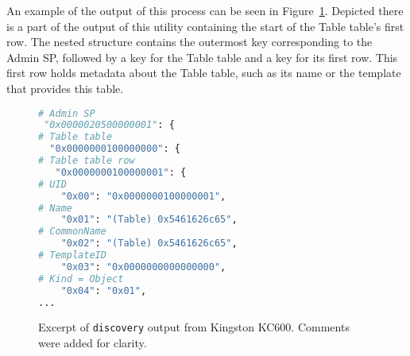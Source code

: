 An example of the output of this process can be seen in Figure~\ref{fig:discovery_example}. Depicted there is a part of the output of this utility containing the start of the Table table's first row. The nested structure contains the outermost key corresponding to the Admin SP, followed by a key for the Table table and a key for its first row. 
This first row holds metadata about the Table table, such as its name or the template that provides this table.


\begin{figure}
    \centering
\begin{lstlisting}[language=Python]
# Admin SP
 "0x0000020500000001": {
# Table table
  "0x0000000100000000": {
# Table table row
   "0x0000000100000001": {
# UID
    "0x00": "0x0000000100000001",
# Name
    "0x01": "(Table) 0x5461626c65",
# CommonName
    "0x02": "(Table) 0x5461626c65",
# TemplateID
    "0x03": "0x0000000000000000",
# Kind = Object
    "0x04": "0x01",
...
\end{lstlisting}
    \caption{Excerpt of \texttt{discovery} output from Kingston KC600. Comments were added for clarity.}
    \label{fig:discovery_example}
\end{figure}



















